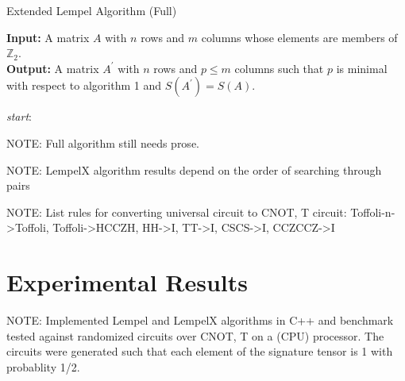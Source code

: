 \documentclass{article}
\theoremstyle{definition}
\theoremstyle{problem}
\theoremstyle{lemma}
\begin{document}
		\begin{algorithm}
			\caption{Extended Lempel Algorithm (Full)}
			\textbf{Input:} A matrix $A$ with $n$ rows and $m$ columns whose elements are members of $\mathbb{Z}_2$.\\
			\textbf{Output:} A matrix $A^\prime$ with $n$ rows and $p \leq m$ columns such that $p$ is minimal with respect to algorithm 1 and $S(A^\prime) = S(A)$.
			\begin{algorithmic}[1]
				\BState \emph{start}:
				\Else
				\EndIf
				\EndProcedure
			\end{algorithmic}
		\end{algorithm}
			
				
				NOTE: Full algorithm still needs prose. %
				
				
				
				NOTE: LempelX algorithm results depend on the order of searching through pairs
				
				NOTE: List rules for converting universal circuit to CNOT, T circuit: Toffoli-n->Toffoli, Toffoli->HCCZH, HH->I, TT->I, CSCS->I, CCZCCZ->I
				
				
			
			\section{Experimental Results}
			NOTE: Implemented Lempel and LempelX algorithms in C++ and benchmark tested against randomized circuits over CNOT, T on a (CPU) processor. The circuits were generated such that each element of the signature tensor is 1 with probablity 1/2.
			
\end{document}
